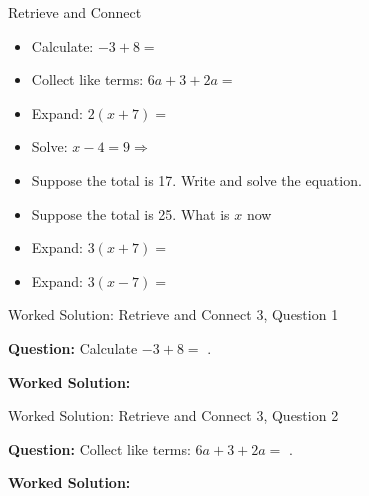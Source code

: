 \documentclass{beamer}
\newcommand{\ablank}[1]{%
  \alt<2>{\textcolor{red}{#1}}{\underline{\phantom{#1}}}%
}
\newcommand{\ashow}[1]{\uncover<2->{\textcolor{red}{\small #1}}}
\newcommand{\ashowq}[1]{\alt<2->{\textcolor{red}{\small #1}}{?}}
\begin{document}
\begin{frame}{Retrieve and Connect}
\hypertarget{q-st3}{}

\begin{itemize}
  \item Calculate: $-3 + 8 =$ \ablank{$5$}
  \item Collect like terms: $6a + 3 + 2a =$ \ablank{$8a+3$}
  \item Expand: $2(x + 7) =$ \ablank{$2x+14$}
  \item Solve: $x - 4 = 9 \Rightarrow$ \ablank{$x=13$}
\end{itemize}

\vspace{0.3cm}

\begin{center}
\end{center}

\begin{itemize}
  \item Suppose the total is 17. Write and solve the equation. \ashow{$2x+5=17$, so $x=6$.}
  \item Suppose the total is 25. What is $x$ now\ashowq{~$x=10$.}
  \item Expand: $3(x+7) =$ \ablank{$3x+21$}
  \item Expand: $3(x-7) =$ \ablank{$3x-21$}
\end{itemize}

\end{frame}

\begin{frame}{Worked Solution: Retrieve and Connect 3, Question 1}
\hypertarget{work-st3}{}

\textbf{Question:} Calculate $-3+8=$\ablank{$5$}.

\textbf{Worked Solution:} \ashow{Start at $-3$ and move $8$ units right: $-3+8=5$.}

\end{frame}

\begin{frame}{Worked Solution: Retrieve and Connect 3, Question 2}

\textbf{Question:} Collect like terms: $6a+3+2a=$\ablank{$8a+3$}.

\textbf{Worked Solution:} \ashow{Collect $a$-terms: $6a+2a=8a$; keep $+3$: $8a+3$.}

\end{frame}
\end{document}
